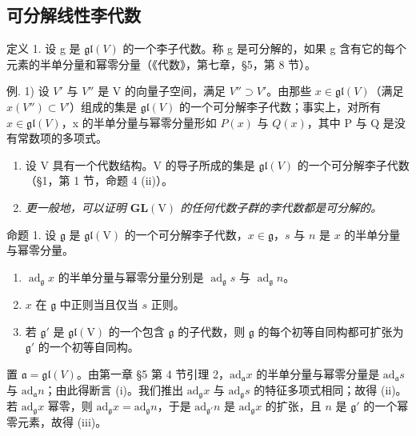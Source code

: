 \subsection{可分解线性李代数}

定义 1. 设 g 是 \(\mathfrak{gl}(V)\) 的一个李子代数。称 g 是可分解的，如果 g 含有它的每个元素的半单分量和幂零分量（《代数》，第七章，§5，第 8 节）。

例. 1) 设 \(V'\) 与 \(V''\) 是 V 的向量子空间，满足 \(V'' \supset V'\)。由那些 \(x \in \mathfrak{gl}(V)\)（满足 \(x(V'') \subset V'\)）组成的集是 \(\mathfrak{gl}(V)\) 的一个可分解李子代数；事实上，对所有 \(x \in \mathfrak{gl}(V)\)，x 的半单分量与幂零分量形如 \(P(x)\) 与 \(Q(x)\)，其中 P 与 Q 是没有常数项的多项式。

\begin{enumerate}
\def\labelenumi{\arabic{enumi})}
\setcounter{enumi}{1}
\item
  设 V 具有一个代数结构。V 的导子所成的集是 \(\mathfrak{gl}(V)\) 的一个可分解李子代数（§1，第 1 节，命题 4 (ii)）。
\item
\emph{更一般地，可以证明 \(\mathbf{GL}(\mathrm{V})\) 的任何代数子群的李代数都是可分解的。}
\end{enumerate}

命题 1. 设 \(\mathfrak{g}\) 是 \(\mathfrak{gl}(\mathrm{V})\) 的一个可分解李子代数，\(x \in \mathfrak{g}\)，\(s\) 与 \(n\) 是 \(x\) 的半单分量与幂零分量。

\begin{enumerate}
\def\labelenumi{(\roman{enumi})}
\item
  \(\operatorname{ad}_{\mathfrak{g}}x\) 的半单分量与幂零分量分别是 \(\operatorname{ad}_{\mathfrak{g}}s\) 与 \(\operatorname{ad}_{\mathfrak{g}}n\)。
\item
  \(x\) 在 \(\mathfrak{g}\) 中正则当且仅当 \(s\) 正则。
\item
  若 \(\mathfrak{g}'\) 是 \(\mathfrak{gl}(\mathrm{V})\) 的一个包含 \(\mathfrak{g}\) 的子代数，则 \(\mathfrak{g}\) 的每个初等自同构都可扩张为 \(\mathfrak{g}'\) 的一个初等自同构。
\end{enumerate}

置 \(\mathfrak{a} = \mathfrak{gl}(V)\)。由第一章 §5 第 4 节引理 2，\(\mathrm{ad}_{\mathfrak{a}}x\) 的半单分量与幂零分量是 \(\mathrm{ad}_{\mathfrak{a}}s\) 与 \(\mathrm{ad}_{\mathfrak{a}}n\)；由此得断言 (i)。我们推出 \(\mathrm{ad}_{\mathfrak{g}}x\) 与 \(\mathrm{ad}_{\mathfrak{g}}s\) 的特征多项式相同；故得 (ii)。若 \(\mathrm{ad}_{\mathfrak{g}}x\) 幂零，则 \(\mathrm{ad}_{\mathfrak{g}}x = \mathrm{ad}_{\mathfrak{g}}n\)，于是 \(\mathrm{ad}_{\mathfrak{g}'}n\) 是 \(\mathrm{ad}_{\mathfrak{g}}x\) 的扩张，且 \(n\) 是 \(\mathfrak{g}'\) 的一个幂零元素，故得 (iii)。

